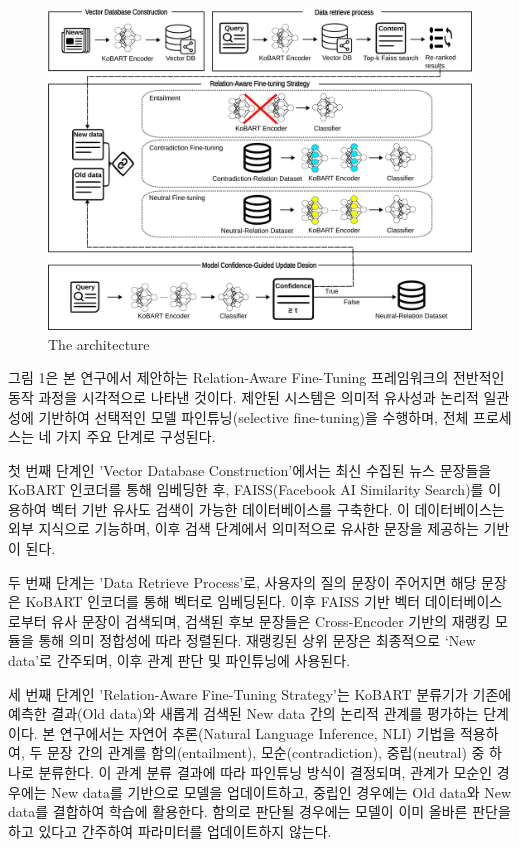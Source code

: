 \documentclass[a4paper,fleqn]{cas-sc}
\begin{document}
\begin{figure}[htbp]
    \centering
    \includegraphics[width=\textwidth]{architecture.png}
    \caption{The architecture }
\end{figure}

그림 1은 본 연구에서 제안하는 Relation-Aware Fine-Tuning 프레임워크의 전반적인 동작 과정을 시각적으로 나타낸 것이다. 제안된 시스템은 의미적 유사성과 논리적 일관성에 기반하여 선택적인 모델 파인튜닝(selective fine-tuning)을 수행하며, 전체 프로세스는 네 가지 주요 단계로 구성된다.

첫 번째 단계인 'Vector Database Construction'에서는 최신 수집된 뉴스 문장들을 KoBART 인코더를 통해 임베딩한 후, FAISS(Facebook AI Similarity Search)를 이용하여 벡터 기반 유사도 검색이 가능한 데이터베이스를 구축한다. 이 데이터베이스는 외부 지식으로 기능하며, 이후 검색 단계에서 의미적으로 유사한 문장을 제공하는 기반이 된다.

두 번째 단계는 'Data Retrieve Process'로, 사용자의 질의 문장이 주어지면 해당 문장은 KoBART 인코더를 통해 벡터로 임베딩된다. 이후 FAISS 기반 벡터 데이터베이스로부터 유사 문장이 검색되며, 검색된 후보 문장들은 Cross-Encoder 기반의 재랭킹 모듈을 통해 의미 정합성에 따라 정렬된다. 재랭킹된 상위 문장은 최종적으로 ‘New data’로 간주되며, 이후 관계 판단 및 파인튜닝에 사용된다.

세 번째 단계인 'Relation-Aware Fine-Tuning Strategy'는 KoBART 분류기가 기존에 예측한 결과(Old data)와 새롭게 검색된 New data 간의 논리적 관계를 평가하는 단계이다. 본 연구에서는 자연어 추론(Natural Language Inference, NLI) 기법을 적용하여, 두 문장 간의 관계를 함의(entailment), 모순(contradiction), 중립(neutral) 중 하나로 분류한다. 이 관계 분류 결과에 따라 파인튜닝 방식이 결정되며, 관계가 모순인 경우에는 New data를 기반으로 모델을 업데이트하고, 중립인 경우에는 Old data와 New data를 결합하여 학습에 활용한다. 함의로 판단될 경우에는 모델이 이미 올바른 판단을 하고 있다고 간주하여 파라미터를 업데이트하지 않는다.
\end{document}

